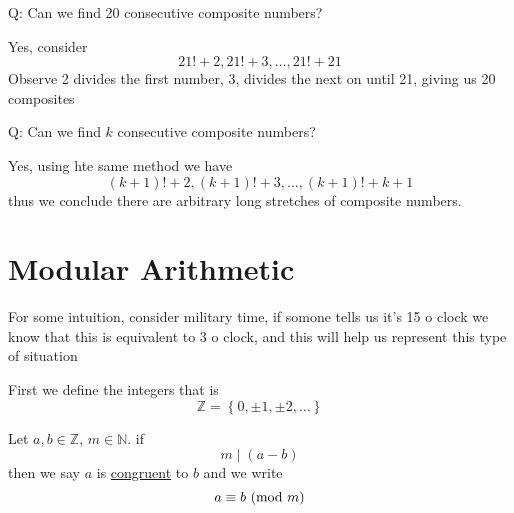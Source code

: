 \documentclass[11pt]{book}
\begin{document}
Q: Can we find 20 consecutive composite numbers?

Yes, consider 
\[
21! + 2, 21!  + 3, \ldots , 21!  + 21
\]
Observe 2 divides the first number, 3, divides the next on until 21, giving us 20 composites

Q: Can we find $k$ consecutive composite numbers?

Yes, using hte same method we have 
\[
    \left( k + 1 \right)!  + 2, \left( k + 1 \right) !  + 3, \ldots , \left( k + 1 \right) !  + k + 1
\]
thus we conclude there are arbitrary long stretches of composite numbers.

\newpage

\section{Modular Arithmetic}%
\label{sec:modular_arithmetic}

For some intuition, consider military time, if somone tells us it's 15 o clock we know that this is equivalent to 3 o clock, and this will help us represent this type of situation

First we define the integers that is 
\[
\mathbb{Z} = \left\{ 0, \pm 1, \pm 2, \ldots  \right\} 
\]

\begin{defn}[Congruence]\label{defn:congruence}
    Let $a, b \in \mathbb{Z} $,  $m \in \mathbb{N} $.  if 
    \[
        m \mid \left( a - b \right) 
    \]
    then we say $a$ is \underline{congruent} to $b$ and we write
    \[
    a \equiv b \ (\mathrm{mod}\ m)
    \]
\end{defn}
\end{document}
